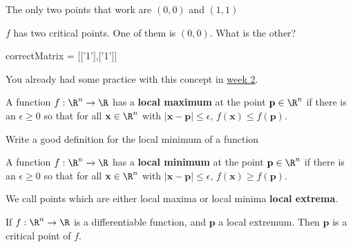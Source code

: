 \documentclass{ximera}
\begin{document}
\begin{question}
\begin{solution}
			\begin{hint}
				The only two points that work are $(0,0)$ and $(1,1)$
			\end{hint}
			$f$ has two critical points.  One of them is $(0,0)$.  What is the other?
			\begin{matrix-answer}
				correctMatrix = [['1'],['1']]
			\end{matrix-answer}
		\end{solution}
	\end{question}
	
	You already had some practice with this concept in \href{http://ximera.osu.edu/course/kisonecat/m2o2c2/course/activity/week2/practice/stationary-points/}{week 2}.
	
	\begin{definition}
		A function $f:\R^n \to \R$ has a \textbf{local maximum} at the point $\mathbf{p} \in \R^n$ if there is an $\epsilon \geq 0$ so that for all $\mathbf{x} \in \R^n$
		with $|\mathbf{x} - \mathbf{p}| \leq \epsilon$, $f(\mathbf{x}) \leq f(\mathbf{p})$.
	\end{definition}
	
	Write a good definition for the local minimum of a function
	\begin{free-response}
		A function $f:\R^n \to \R$ has a \textbf{local minimum} at the point $\mathbf{p} \in \R^n$ if there is an $\epsilon \geq 0$ so that for all $\mathbf{x} \in \R^n$
		with $|\mathbf{x} - \mathbf{p}| \leq \epsilon$, $f(\mathbf{x}) \geq f(\mathbf{p})$.
	\end{free-response}
		
		We call points which are either local maxima or local minima \textbf{local extrema}.
		
	\begin{theorem}
		If $f:\R^n \to \R$ is a differentiable function, and $\mathbf{p}$ a local extremum.  Then $\mathbf{p}$ is a critical point of $f$.
	\end{theorem}
	
\end{document}
